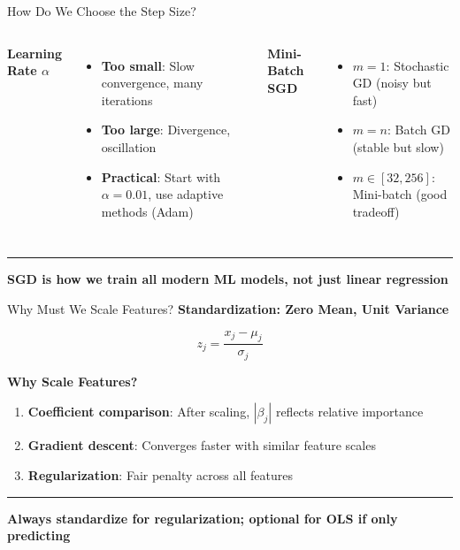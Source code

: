 \documentclass[8pt,aspectratio=169]{beamer}
\newcommand{\bottomnote}[1]{%
\vfill
\vspace{-2mm}
\textcolor{mllavender2}{\rule{\textwidth}{0.4pt}}
\vspace{1mm}
\footnotesize
\textbf{#1}
}
\begin{document}
\begin{frame}[t]{How Do We Choose the Step Size?}
\begin{columns}[T]
\textbf{Learning Rate $\alpha$}

\begin{itemize}
  \item \textbf{Too small}: Slow convergence, many iterations
  \item \textbf{Too large}: Divergence, oscillation
  \item \textbf{Practical}: Start with $\alpha = 0.01$, use adaptive methods (Adam)
\end{itemize}

\textbf{Mini-Batch SGD}

\begin{itemize}
  \item $m = 1$: Stochastic GD (noisy but fast)
  \item $m = n$: Batch GD (stable but slow)
  \item $m \in [32, 256]$: Mini-batch (good tradeoff)
\end{itemize}
\end{columns}

\bottomnote{SGD is how we train all modern ML models, not just linear regression}
\end{frame}

\begin{frame}[t]{Why Must We Scale Features?}
  \textbf{Standardization: Zero Mean, Unit Variance}

  \begin{equation}
    z_j = \frac{x_j - \mu_j}{\sigma_j}
  \end{equation}

  \textbf{Why Scale Features?}
  \begin{enumerate}
    \item \textbf{Coefficient comparison}: After scaling, $|\beta_j|$ reflects relative importance
    \item \textbf{Gradient descent}: Converges faster with similar feature scales
    \item \textbf{Regularization}: Fair penalty across all features
  \end{enumerate}

  \bottomnote{Always standardize for regularization; optional for OLS if only predicting}
\end{frame}
\end{document}
